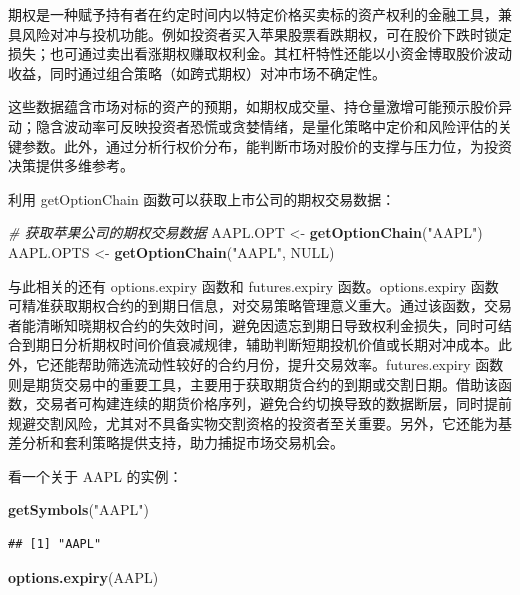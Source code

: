 \documentclass[]{ctexbook}
\newenvironment{Shaded}{\begin{snugshade}}{\end{snugshade}}
\newcommand{\CommentTok}[1]{\textcolor[rgb]{0.56,0.35,0.01}{\textit{#1}}}
\newcommand{\ConstantTok}[1]{\textcolor[rgb]{0.56,0.35,0.01}{#1}}
\newcommand{\FunctionTok}[1]{\textcolor[rgb]{0.13,0.29,0.53}{\textbf{#1}}}
\newcommand{\NormalTok}[1]{#1}
\newcommand{\OtherTok}[1]{\textcolor[rgb]{0.56,0.35,0.01}{#1}}
\newcommand{\StringTok}[1]{\textcolor[rgb]{0.31,0.60,0.02}{#1}}
\begin{document}
期权是一种赋予持有者在约定时间内以特定价格买卖标的资产权利的金融工具，兼具风险对冲与投机功能。例如投资者买入苹果股票看跌期权，可在股价下跌时锁定损失；也可通过卖出看涨期权赚取权利金。其杠杆特性还能以小资金博取股价波动收益，同时通过组合策略（如跨式期权）对冲市场不确定性。

这些数据蕴含市场对标的资产的预期，如期权成交量、持仓量激增可能预示股价异动；隐含波动率可反映投资者恐慌或贪婪情绪，是量化策略中定价和风险评估的关键参数。此外，通过分析行权价分布，能判断市场对股价的支撑与压力位，为投资决策提供多维参考。

利用 getOptionChain 函数可以获取上市公司的期权交易数据：

\begin{Shaded}
\begin{Highlighting}[]
\CommentTok{\# 获取苹果公司的期权交易数据}
\NormalTok{AAPL.OPT }\OtherTok{\textless{}{-}} \FunctionTok{getOptionChain}\NormalTok{(}\StringTok{"AAPL"}\NormalTok{)}
\NormalTok{AAPL.OPTS }\OtherTok{\textless{}{-}} \FunctionTok{getOptionChain}\NormalTok{(}\StringTok{"AAPL"}\NormalTok{, }\ConstantTok{NULL}\NormalTok{)}
\end{Highlighting}
\end{Shaded}

与此相关的还有 options.expiry 函数和 futures.expiry 函数。options.expiry 函数可精准获取期权合约的到期日信息，对交易策略管理意义重大。通过该函数，交易者能清晰知晓期权合约的失效时间，避免因遗忘到期日导致权利金损失，同时可结合到期日分析期权时间价值衰减规律，辅助判断短期投机价值或长期对冲成本。此外，它还能帮助筛选流动性较好的合约月份，提升交易效率。futures.expiry 函数则是期货交易中的重要工具，主要用于获取期货合约的到期或交割日期。借助该函数，交易者可构建连续的期货价格序列，避免合约切换导致的数据断层，同时提前规避交割风险，尤其对不具备实物交割资格的投资者至关重要。另外，它还能为基差分析和套利策略提供支持，助力捕捉市场交易机会。

看一个关于 AAPL 的实例：

\begin{Shaded}
\begin{Highlighting}[]
\FunctionTok{getSymbols}\NormalTok{(}\StringTok{"AAPL"}\NormalTok{)}
\end{Highlighting}
\end{Shaded}

\begin{verbatim}
## [1] "AAPL"
\end{verbatim}

\begin{Shaded}
\begin{Highlighting}[]
\FunctionTok{options.expiry}\NormalTok{(AAPL)}
\end{Highlighting}
\end{Shaded}
\end{document}
